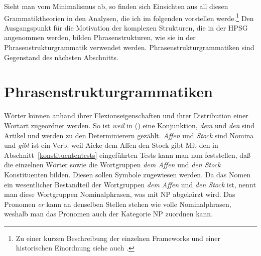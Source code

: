\noindent
Sieht man vom Minimalismus ab, so finden sich Einsichten aus all diesen Grammatiktheorien
in den Analysen, die ich im folgenden vorstellen werde.\footnote{
  Zu einer kurzen Beschreibung der einzelnen Frameworks und einer historischen Einordnung
  siehe auch .%
}
Den Ausgangspunkt für die Motivation
der komplexen Strukturen, die in der HPSG angenommen werden, bilden Phrasenstrukturen, wie sie
in der Phrasenstrukturgrammatik verwendet werden. Phrasenstrukturgrammatiken sind Gegenstand des
nächsten Abschnitts.


\section{Phrasenstrukturgrammatiken}
\label{sec-psg}

Wörter können anhand ihrer Flexionseigenschaften und ihrer Distribution einer Wortart zugeordnet werden.
So ist \emph{weil} in () eine Konjunktion, \emph{dem} und \emph {den}
sind Artikel und werden zu den Determinierern gezählt. \emph{Affen} und \emph{Stock} sind Nomina und \emph{gibt}
ist ein Verb.
\ea
\label{bsp-weil-Aicke-dem-Affen-den-Stock-gibt}
weil Aicke dem Affen den Stock gibt
\z
Mit den in Abschnitt~\ref{konstituententests} eingeführten Tests kann man nun feststellen, daß
die einzelnen Wörter sowie die Wortgruppen \emph{dem Affen} und \emph{den Stock} Konstituenten bilden.
Diesen sollen Symbole zugewiesen werden. Da das Nomen ein wesentlicher Bestandteil der Wortgruppen
\emph{dem Affen} und \emph{den Stock} ist, nennt man diese Wortgruppen Nominalphrasen, was mit NP abgekürzt wird. Das Pronomen \emph{er}
kann an denselben Stellen stehen wie volle Nominalphrasen, weshalb man das Pronomen auch der
Kategorie NP zuordnen kann.

